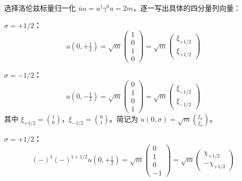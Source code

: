 选择洛伦兹标量归一化 $\bar{u}u = u^\dagger\gamma^0 u = 2m$，逐一写出具体的四分量列向量：

\textbf{$\sigma = +1/2$：}
\begin{equation}
    u(0, +\tfrac{1}{2}) = \sqrt{m}\begin{pmatrix} 1\\0\\1\\0 \end{pmatrix} = \sqrt{m}\begin{pmatrix} \xi_{+1/2} \\ \xi_{+1/2} \end{pmatrix}
\end{equation}

\textbf{$\sigma = -1/2$：}
\begin{equation}
    u(0, -\tfrac{1}{2}) = \sqrt{m}\begin{pmatrix} 0\\1\\0\\1 \end{pmatrix} = \sqrt{m}\begin{pmatrix} \xi_{-1/2} \\ \xi_{-1/2} \end{pmatrix}
\end{equation}
其中 $\xi_{+1/2} = \binom{1}{0}$，$\xi_{-1/2} = \binom{0}{1}$。简记为 $u(0,\sigma) = \sqrt{m}\binom{\xi_\sigma}{\xi_\sigma}$。

\textbf{$\sigma = +1/2$：} 
\begin{equation}
    (-)^{1}(-)^{1+1/2}u(0, +\tfrac{1}{2}) = \sqrt{m}\begin{pmatrix} 0\\1\\0\\-1 \end{pmatrix} = \sqrt{m}\begin{pmatrix} \chi_{+1/2} \\ -\chi_{+1/2} \end{pmatrix}
\end{equation}

